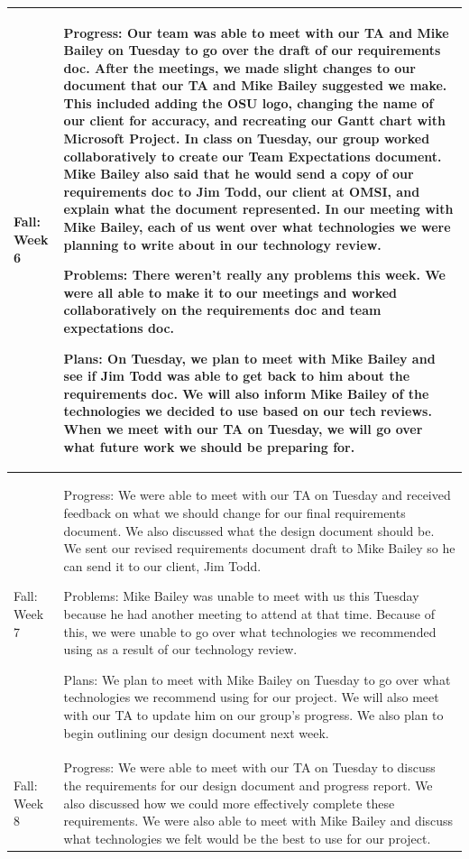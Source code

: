 \documentclass[onecolumn, draftclsnofoot,10pt, compsoc]{IEEEtran}
\begin{document}
\begin{longtable} {|p{1.5cm}|p{13.5cm}|}
Fall: Week 6 & 

Progress: Our team was able to meet with our TA and Mike Bailey on Tuesday to go over the draft of our requirements doc. After the meetings, we made slight changes to our document that our TA and Mike Bailey suggested we make. This included adding the OSU logo, changing the name of our client for accuracy, and recreating our Gantt chart with Microsoft Project. In class on Tuesday, our group worked collaboratively to create our Team Expectations document. Mike Bailey also said that he would send a copy of our requirements doc to Jim Todd, our client at OMSI, and explain what the document represented. In our meeting with Mike Bailey, each of us went over what technologies we were planning to write about in our technology review.

Problems: There weren't really any problems this week. We were all able to make it to our meetings and worked collaboratively on the requirements doc and team expectations doc.

Plans: On Tuesday, we plan to meet with Mike Bailey and see if Jim Todd was able to get back to him about the requirements doc. We will also inform Mike Bailey of the technologies we decided to use based on our tech reviews. When we meet with our TA on Tuesday, we will go over what future work we should be preparing for. \\ \hline

Fall: Week 7 & 
Progress: We were able to meet with our TA on Tuesday and received feedback on what we should change for our final requirements document. We also discussed what the design document should be. We sent our revised requirements document draft to Mike Bailey so he can send it to our client, Jim Todd.

Problems: Mike Bailey was unable to meet with us this Tuesday because he had another meeting to attend at that time. Because of this, we were unable to go over what technologies we recommended using as a result of our technology review.

Plans: We plan to meet with Mike Bailey on Tuesday to go over what technologies we recommend using for our project. We will also meet with our TA to update him on our group's progress. We also plan to begin outlining our design document next week. \\ \hline

Fall: Week 8 & 
Progress: We were able to meet with our TA on Tuesday to discuss the requirements for our design document and progress report. We also discussed how we could more effectively complete these requirements. We were also able to meet with Mike Bailey and discuss what technologies we felt would be the best to use for our project. 


\end{longtable}
\end{document}
